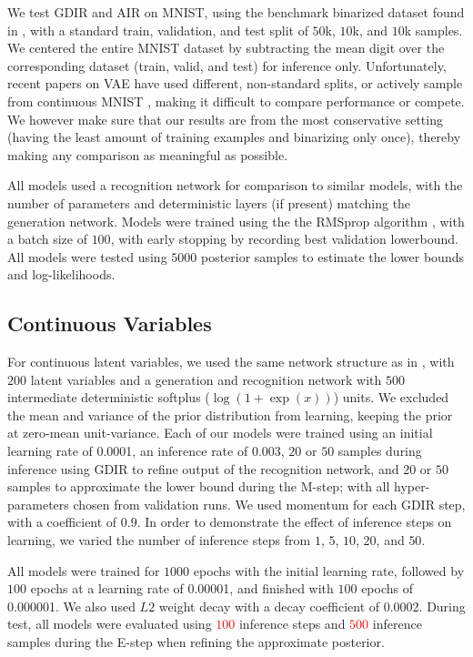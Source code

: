 \documentclass{article} %
\newcommand{\alert}[1]{\textcolor{red}{#1}}
\begin{document}
We test GDIR and AIR on MNIST, using the benchmark binarized dataset found in
\citep{salakhutdinov2008quantitative}, with a standard train, validation, and
test split of $50$k, $10$k, and $10$k samples. We centered the entire MNIST dataset by subtracting the mean digit over the corresponding dataset (train, valid, and test) for inference only. Unfortunately, recent papers on
VAE \citep{mnih2014neural, icml2015_salimans15} have used different, non-standard
splits, or actively sample from continuous MNIST \citep{burda2015importance},
making it difficult to compare performance or compete. We however make sure that our results are from
the most conservative setting (having the least amount of training examples and
binarizing only once),
thereby making any comparison as meaningful as possible.

All models used a recognition network for comparison to similar models, with
the number of parameters and deterministic layers (if present) matching the
generation network. Models were trained using the the RMSprop algorithm
\citep{Hinton-Coursera2012}, with a batch size of $100$, with early stopping by
recording best validation lowerbound. All models were tested using $5000$ posterior samples
to estimate the lower bounds and log-likelihoods.

\subsection{Continuous Variables}
For continuous latent variables, we used the same network structure as in
\citep{kingma2013auto, icml2015_salimans15}, with $200$ latent variables and a
generation and recognition network with $500$ intermediate deterministic
softplus ($\log (1 + \exp(x))$) units. We excluded the mean and variance of the prior distribution from learning, keeping the prior at zero-mean unit-variance.
Each of our models were trained using an initial learning
rate of \num{0.0001}, an inference rate of \num{0.003}, $20$ or $50$ samples
during inference using GDIR to refine output of the recognition network, and
$20$ or $50$ samples to approximate the lower bound during the M-step; with all
hyper-parameters chosen from validation runs. We used momentum for each GDIR step, with a coefficient of $0.9$. In order to demonstrate the effect
of inference steps on learning, we varied the number of inference steps from
$1$, $5$, $10$, $20$, and $50$.

All models were trained for $1000$ epochs with the initial learning rate,
followed by $100$ epochs at a learning rate of \num{0.00001}, and finished with
$100$ epochs of \num{0.000001}. We also used $L2$ weight decay with a decay
coefficient of \num{0.0002}. During test, all models were evaluated using \alert{$100$}
inference steps and \alert{$500$} inference samples during the E-step when refining the approximate posterior.
\end{document}
